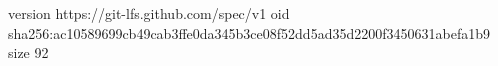 version https://git-lfs.github.com/spec/v1
oid sha256:ac10589699cb49cab3ffe0da345b3ce08f52dd5ad35d2200f3450631abefa1b9
size 92
